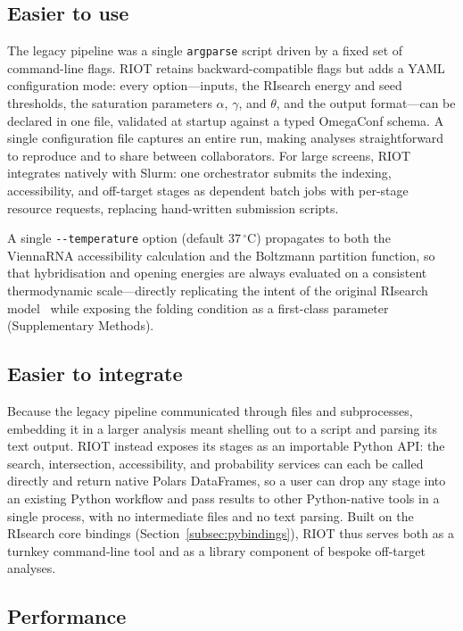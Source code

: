 \subsection*{Easier to use}

The legacy pipeline was a single \texttt{argparse} script driven by a fixed set
of command-line flags. RIOT retains backward-compatible flags but adds a
YAML configuration mode: every option---inputs, the RIsearch energy and seed
thresholds, the saturation parameters $\alpha$, $\gamma$, and $\theta$, and the
output format---can be declared in one file, validated at startup against a
typed OmegaConf schema. A single configuration file captures an entire run,
making analyses straightforward to reproduce and to share between collaborators.
For large screens, RIOT integrates natively with Slurm: one orchestrator
submits the indexing, accessibility, and off-target stages as dependent batch
jobs with per-stage resource requests, replacing hand-written submission
scripts.

A single \texttt{-{}-temperature} option (default $37\,^\circ$C) propagates to
both the ViennaRNA accessibility calculation and the Boltzmann partition
function, so that hybridisation and opening energies are always evaluated on a
consistent thermodynamic scale---directly replicating the intent of the original
RIsearch model~\citep{wenzel2012risearch} while exposing the folding condition
as a first-class parameter (Supplementary Methods).

\subsection*{Easier to integrate}

Because the legacy pipeline communicated through files and subprocesses,
embedding it in a larger analysis meant shelling out to a script and parsing its
text output. RIOT instead exposes its stages as an importable Python
API: the search, intersection, accessibility, and probability services can each
be called directly and return native Polars DataFrames, so a user can drop any
stage into an existing Python workflow and pass results to other Python-native
tools in a single process, with no intermediate files and no text parsing. Built
on the RIsearch core bindings (Section~\ref{subsec:pybindings}), RIOT thus
serves both as a turnkey command-line tool and as a library component of bespoke
off-target analyses.

\subsection*{Performance}

